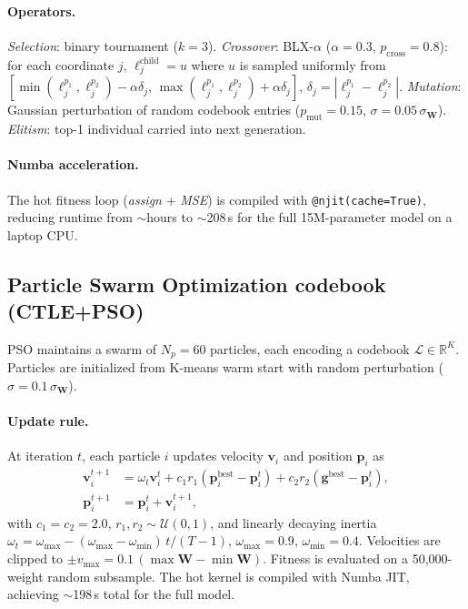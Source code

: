 \documentclass[lettersize,journal]{IEEEtran}
\begin{document}
\paragraph{Operators.}
\textit{Selection}: binary tournament ($k=3$).
\textit{Crossover}: BLX-$\alpha$ ($\alpha=0.3$, $p_\mathrm{cross}=0.8$):
for each coordinate $j$, $\ell_j^{\mathrm{child}} = u$ where $u$ is sampled
uniformly from
$[\min(\ell_j^{p_1},\ell_j^{p_2})-\alpha\delta_j,\,
   \max(\ell_j^{p_1},\ell_j^{p_2})+\alpha\delta_j]$,
$\delta_j=|\ell_j^{p_1}-\ell_j^{p_2}|$.
\textit{Mutation}: Gaussian perturbation of random codebook entries
($p_\mathrm{mut}=0.15$, $\sigma=0.05\,\sigma_\mathbf{W}$).
\textit{Elitism}: top-1 individual carried into next generation.

\paragraph{Numba acceleration.}
The hot fitness loop (\textit{assign} + \textit{MSE}) is compiled with
\texttt{@njit(cache=True)}, reducing runtime from $\sim$hours to $\sim$208\,s
for the full 15M-parameter model on a laptop CPU.

\subsection{Particle Swarm Optimization codebook (CTLE+PSO)}
\label{subsec:pso}

PSO maintains a swarm of $N_p=60$ particles, each encoding a codebook
$\mathcal{L}\in\mathbb{R}^K$. Particles are initialized from K-means warm start
with random perturbation ($\sigma=0.1\,\sigma_\mathbf{W}$).

\paragraph{Update rule.}
At iteration $t$, each particle $i$ updates velocity $\mathbf{v}_i$ and
position $\mathbf{p}_i$ as
\begin{align}
\mathbf{v}_i^{t+1} &= \omega_t \mathbf{v}_i^{t}
  + c_1 r_1 (\mathbf{p}_i^\mathrm{best} - \mathbf{p}_i^{t})
  + c_2 r_2 (\mathbf{g}^\mathrm{best} - \mathbf{p}_i^{t}), \\
\mathbf{p}_i^{t+1} &= \mathbf{p}_i^{t} + \mathbf{v}_i^{t+1},
\end{align}
with $c_1 = c_2 = 2.0$, $r_1,r_2 \sim \mathcal{U}(0,1)$, and
linearly decaying inertia $\omega_t = \omega_\mathrm{max} -
(\omega_\mathrm{max}-\omega_\mathrm{min})\,t/(T-1)$,
$\omega_\mathrm{max}=0.9$, $\omega_\mathrm{min}=0.4$.
Velocities are clipped to $\pm v_\mathrm{max}=0.1\,(\max\mathbf{W}-\min\mathbf{W})$.
Fitness is evaluated on a 50{,}000-weight random subsample.
The hot kernel is compiled with Numba JIT, achieving $\sim$198\,s total for the
full model.
\end{document}
